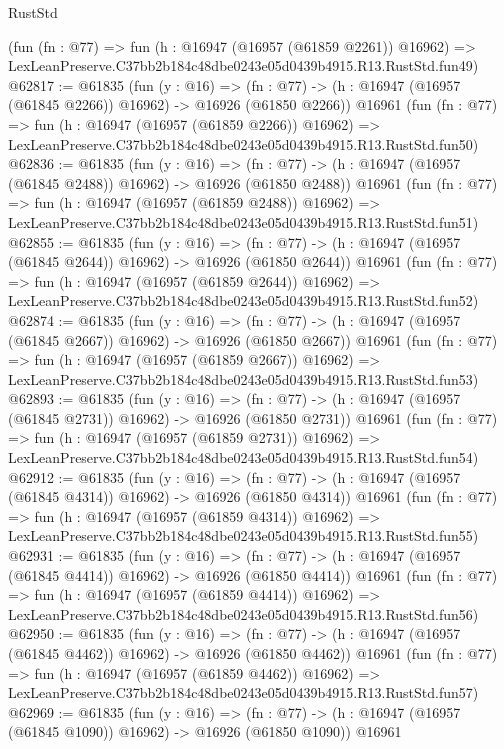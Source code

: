 \begin{lexlean}{RustStd}
\begin{coremodule}
    (fun (fn : @77) =>
    fun (h : @16947 (@16957 (@61859 @2261)) @16962) =>
    LexLeanPreserve.C37bb2b184c48dbe0243e05d0439b4915.R13.RustStd.fun49)
@62817 := @61835
    (fun (y : @16) =>
    (fn : @77) -> (h : @16947 (@16957 (@61845 @2266)) @16962) -> @16926 (@61850 @2266))
    @16961
    (fun (fn : @77) =>
    fun (h : @16947 (@16957 (@61859 @2266)) @16962) =>
    LexLeanPreserve.C37bb2b184c48dbe0243e05d0439b4915.R13.RustStd.fun50)
@62836 := @61835
    (fun (y : @16) =>
    (fn : @77) -> (h : @16947 (@16957 (@61845 @2488)) @16962) -> @16926 (@61850 @2488))
    @16961
    (fun (fn : @77) =>
    fun (h : @16947 (@16957 (@61859 @2488)) @16962) =>
    LexLeanPreserve.C37bb2b184c48dbe0243e05d0439b4915.R13.RustStd.fun51)
@62855 := @61835
    (fun (y : @16) =>
    (fn : @77) -> (h : @16947 (@16957 (@61845 @2644)) @16962) -> @16926 (@61850 @2644))
    @16961
    (fun (fn : @77) =>
    fun (h : @16947 (@16957 (@61859 @2644)) @16962) =>
    LexLeanPreserve.C37bb2b184c48dbe0243e05d0439b4915.R13.RustStd.fun52)
@62874 := @61835
    (fun (y : @16) =>
    (fn : @77) -> (h : @16947 (@16957 (@61845 @2667)) @16962) -> @16926 (@61850 @2667))
    @16961
    (fun (fn : @77) =>
    fun (h : @16947 (@16957 (@61859 @2667)) @16962) =>
    LexLeanPreserve.C37bb2b184c48dbe0243e05d0439b4915.R13.RustStd.fun53)
@62893 := @61835
    (fun (y : @16) =>
    (fn : @77) -> (h : @16947 (@16957 (@61845 @2731)) @16962) -> @16926 (@61850 @2731))
    @16961
    (fun (fn : @77) =>
    fun (h : @16947 (@16957 (@61859 @2731)) @16962) =>
    LexLeanPreserve.C37bb2b184c48dbe0243e05d0439b4915.R13.RustStd.fun54)
@62912 := @61835
    (fun (y : @16) =>
    (fn : @77) -> (h : @16947 (@16957 (@61845 @4314)) @16962) -> @16926 (@61850 @4314))
    @16961
    (fun (fn : @77) =>
    fun (h : @16947 (@16957 (@61859 @4314)) @16962) =>
    LexLeanPreserve.C37bb2b184c48dbe0243e05d0439b4915.R13.RustStd.fun55)
@62931 := @61835
    (fun (y : @16) =>
    (fn : @77) -> (h : @16947 (@16957 (@61845 @4414)) @16962) -> @16926 (@61850 @4414))
    @16961
    (fun (fn : @77) =>
    fun (h : @16947 (@16957 (@61859 @4414)) @16962) =>
    LexLeanPreserve.C37bb2b184c48dbe0243e05d0439b4915.R13.RustStd.fun56)
@62950 := @61835
    (fun (y : @16) =>
    (fn : @77) -> (h : @16947 (@16957 (@61845 @4462)) @16962) -> @16926 (@61850 @4462))
    @16961
    (fun (fn : @77) =>
    fun (h : @16947 (@16957 (@61859 @4462)) @16962) =>
    LexLeanPreserve.C37bb2b184c48dbe0243e05d0439b4915.R13.RustStd.fun57)
@62969 := @61835
    (fun (y : @16) =>
    (fn : @77) -> (h : @16947 (@16957 (@61845 @1090)) @16962) -> @16926 (@61850 @1090))
    @16961

\end{coremodule}
\end{lexlean}
